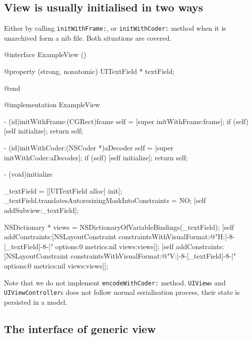 \documentclass[10pt]{extarticle}
\newenvironment{codelisting}
{\footnotesize\mdframed[middlelinewidth=0.5pt, middlelinecolor=BaliHaiColor, skipabove=15pt]\verbatim}
{\endverbatim\endmdframed\vspace{12pt}\normalsize}
\newcommand{\inlinecode}[1]{{\textcolor{TundoraColor}{\texttt{#1}}}}
\begin{document}
\subsection{View is usually initialised in two ways}

Either by calling \inlinecode{initWithFrame:}, or \inlinecode{initWithCoder:} method when it is unarchived form a nib file. Both situations are covered.

\begin{codelisting}
@interface ExampleView ()

@property (strong, nonatomic) UITextField * textField;

@end

@implementation ExampleView

- (id)initWithFrame:(CGRect)frame
{
    self = [super initWithFrame:frame];
    if (self) {
        [self initialize];
    }
    return self;
}

- (id)initWithCoder:(NSCoder *)aDecoder
{
    self = [super initWithCoder:aDecoder];
    if (self) {
        [self initialize];
    }
    return self;
}

- (void)initialize
{
    _textField = [[UITextField alloc] init];
    _textField.translatesAutoresizingMaskIntoConstraints = NO;
    [self addSubview:_textField];
    
    NSDictionary * views = NSDictionaryOfVariableBindings(_textField);
    [self addConstraints:[NSLayoutConstraint constraintsWithVisualFormat:@"H:|-8-[_textField]-8-|"
                                                                 options:0
                                                                 metrics:nil
                                                                   views:views]];
    [self addConstraints:[NSLayoutConstraint constraintsWithVisualFormat:@"V:|-8-[_textField]-8-|"
                                                                 options:0
                                                                 metrics:nil
                                                                   views:views]];
}
\end{codelisting}

Note that we do not implement \inlinecode{encodeWithCoder:} method. \inlinecode{UIView}s and \inlinecode{UIViewController}s does not follow normal serialisation process, their state is persisted in a model.


\subsection{The interface of generic view}
\end{document}
